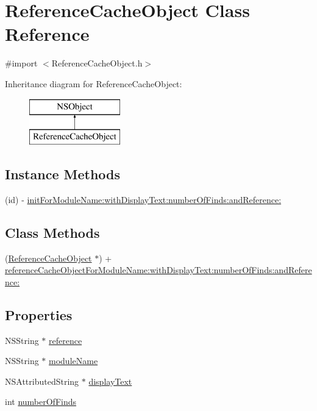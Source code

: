 \hypertarget{interface_reference_cache_object}{\section{Reference\-Cache\-Object Class Reference}
\label{interface_reference_cache_object}
}


{\ttfamily \#import $<$Reference\-Cache\-Object.\-h$>$}

Inheritance diagram for Reference\-Cache\-Object\-:\begin{figure}[H]
\begin{center}
\leavevmode
\includegraphics[height=2.000000cm]{interface_reference_cache_object}
\end{center}
\end{figure}
\subsection*{Instance Methods}
\begin{DoxyCompactItemize}
\item 
(id) -\/ \hyperlink{interface_reference_cache_object_ac63818f542c6d14c5fc9668ede52ed19}{init\-For\-Module\-Name\-:with\-Display\-Text\-:number\-Of\-Finds\-:and\-Reference\-:}
\end{DoxyCompactItemize}
\subsection*{Class Methods}
\begin{DoxyCompactItemize}
\item 
(\hyperlink{interface_reference_cache_object}{Reference\-Cache\-Object} $\ast$) + \hyperlink{interface_reference_cache_object_af17d0f7dccb0a895efc11a3db51b928a}{reference\-Cache\-Object\-For\-Module\-Name\-:with\-Display\-Text\-:number\-Of\-Finds\-:and\-Reference\-:}
\end{DoxyCompactItemize}
\subsection*{Properties}
\begin{DoxyCompactItemize}
\item 
N\-S\-String $\ast$ \hyperlink{interface_reference_cache_object_a934a327293856e28b3dde0cab70e273c}{reference}
\item 
N\-S\-String $\ast$ \hyperlink{interface_reference_cache_object_acacdad1bfe04a0b3f861f8c702e3346f}{module\-Name}
\item 
N\-S\-Attributed\-String $\ast$ \hyperlink{interface_reference_cache_object_a5444e2c4d78ceccf0e9ea6472d0150c2}{display\-Text}
\item 
int \hyperlink{interface_reference_cache_object_aa6afa19ec30e64ac644a286acefa8684}{number\-Of\-Finds}
\end{DoxyCompactItemize}


